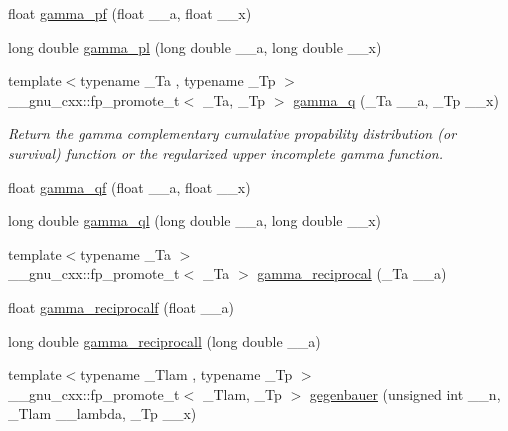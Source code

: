 \begin{DoxyCompactItemize}
float \hyperlink{group__gnu__math__spec__func_gac9a59be05877d3c14fa95bebcf15e8df}{gamma\+\_\+pf} (float \+\_\+\+\_\+a, float \+\_\+\+\_\+x)
\item 
long double \hyperlink{group__gnu__math__spec__func_gaa37f4adf9942ce8e095f440963b330a6}{gamma\+\_\+pl} (long double \+\_\+\+\_\+a, long double \+\_\+\+\_\+x)
\item 
{\footnotesize template$<$typename \+\_\+\+Ta , typename \+\_\+\+Tp $>$ }\\\+\_\+\+\_\+gnu\+\_\+cxx\+::fp\+\_\+promote\+\_\+t$<$ \+\_\+\+Ta, \+\_\+\+Tp $>$ \hyperlink{group__gnu__math__spec__func_ga10c246b2fa2ce000dc5d7c81e9e98c58}{gamma\+\_\+q} (\+\_\+\+Ta \+\_\+\+\_\+a, \+\_\+\+Tp \+\_\+\+\_\+x)
\begin{DoxyCompactList}\small\item\em Return the gamma complementary cumulative propability distribution (or survival) function or the regularized upper incomplete gamma function. \end{DoxyCompactList}\item 
float \hyperlink{group__gnu__math__spec__func_ga3ee8d2c40b904952538709cbb0e664a4}{gamma\+\_\+qf} (float \+\_\+\+\_\+a, float \+\_\+\+\_\+x)
\item 
long double \hyperlink{group__gnu__math__spec__func_ga5364a098596681809294d25741539ffc}{gamma\+\_\+ql} (long double \+\_\+\+\_\+a, long double \+\_\+\+\_\+x)
\item 
{\footnotesize template$<$typename \+\_\+\+Ta $>$ }\\\+\_\+\+\_\+gnu\+\_\+cxx\+::fp\+\_\+promote\+\_\+t$<$ \+\_\+\+Ta $>$ \hyperlink{group__gnu__math__spec__func_ga641f9bcdb8fc32a9a0ce7a15b5040076}{gamma\+\_\+reciprocal} (\+\_\+\+Ta \+\_\+\+\_\+a)
\item 
float \hyperlink{group__gnu__math__spec__func_ga10cccd5045490ac24590c094c43107d8}{gamma\+\_\+reciprocalf} (float \+\_\+\+\_\+a)
\item 
long double \hyperlink{group__gnu__math__spec__func_ga73bfcace13daa8b50e7e7e3f583a2eb0}{gamma\+\_\+reciprocall} (long double \+\_\+\+\_\+a)
\item 
{\footnotesize template$<$typename \+\_\+\+Tlam , typename \+\_\+\+Tp $>$ }\\\+\_\+\+\_\+gnu\+\_\+cxx\+::fp\+\_\+promote\+\_\+t$<$ \+\_\+\+Tlam, \+\_\+\+Tp $>$ \hyperlink{group__gnu__math__spec__func_ga512e7981e328d6184f604de1892048b6}{gegenbauer} (unsigned int \+\_\+\+\_\+n, \+\_\+\+Tlam \+\_\+\+\_\+lambda, \+\_\+\+Tp \+\_\+\+\_\+x)
\item 

\end{DoxyCompactItemize}
